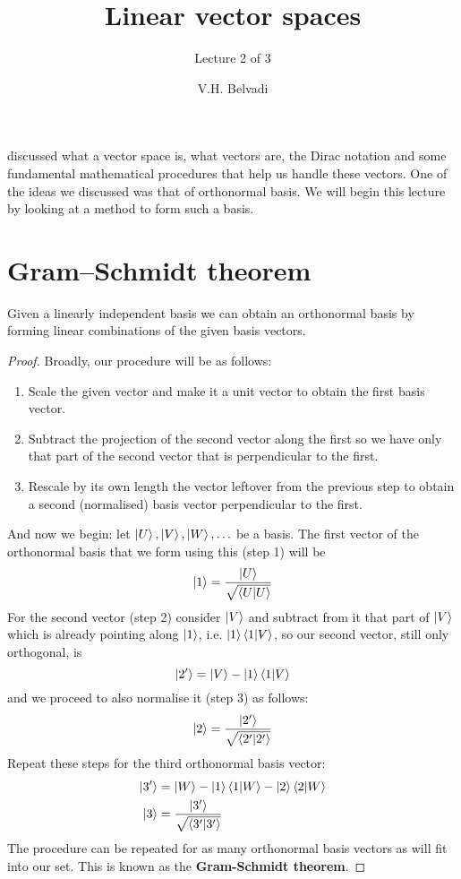 \documentclass[english,seminar,headertitle]{lecture}
\title{Linear vector spaces}
\subtitle{Lecture 2 of 3\vspace*{-1em}}
\author{V.H. Belvadi}
\date{}{}{}
\begin{document}
\noindent{} discussed what a vector space is, what vectors are, the Dirac notation and some fundamental mathematical procedures that help us handle these vectors. One of the ideas we discussed was that of orthonormal basis. We will begin this lecture by looking at a method to form such a basis.

\section{Gram--Schmidt theorem}

\begin{theorem}
	Given a linearly independent basis we can obtain an orthonormal basis by forming linear combinations of the given basis vectors.
\end{theorem}

\begin{proof}
	Broadly, our procedure will be as follows:
	\begin{enumerate}
		\item Scale the given vector and make it a unit vector to obtain the first basis vector.
		\item Subtract the projection of the second vector along the first so we have only that part of the second vector that is perpendicular to the first.
		\item Rescale by its own length the vector leftover from the previous step to obtain a second (normalised) basis vector perpendicular to the first.
	\end{enumerate}
	
	And now we begin: let $\ket{U}, \ket{V}, \ket{W}, \ldots$ be a basis. The first vector of the orthonormal basis that we form using this (step 1) will be
	\[
		\ket{1} = {\ket{U} \over \sqrt{\braket{U|U}}}
	\]
	For the second vector (step 2) consider $\ket{V}$ and subtract from it that part of $\ket{V}$ which is already pointing along $\ket{1}$, i.e. $\ket{1}\braket{1|V}$, so our second vector, still only orthogonal, is
	\[
		\ket{2'} = \ket{V} - \ket{1}\braket{1|V}
	\]
	and we proceed to also normalise it (step 3) as follows:
	\[
		\ket{2} = {\ket{2'} \over \sqrt{\braket{2'|2'}}}
	\]
	Repeat these steps for the third orthonormal basis vector:
	\begin{align*}
		\ket{3'} &= {\ket{W} - \ket{1}\braket{1|W} - \ket{2}\braket{2|W}} \\
		\ket{3} &= {\ket{3'} \over \sqrt{\braket{3'|3'}}}
	\end{align*}
	The procedure can be repeated for as many orthonormal basis vectors as will fit into our set. This is known as the \textbf{Gram-Schmidt theorem}.
\end{proof}
\end{document}
